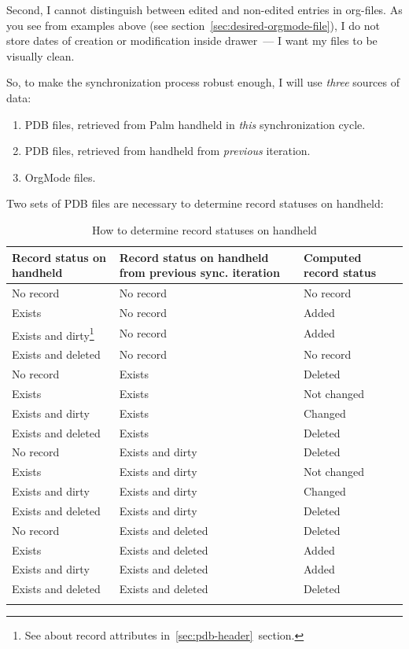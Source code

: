 \documentclass[a4paper,12pt,oneside]{scrartcl}
\begin{document}
Second, I cannot distinguish between edited and non-edited entries in
org-files. As you see from examples above (see
section~\ref{sec:desired-orgmode-file}), I do not store dates of creation or
modification inside drawer~--- I want my files to be visually clean.

So, to make the synchronization process robust enough, I will use \textit{three}
sources of data:
\begin{enumerate}
\item PDB files, retrieved from Palm handheld in \textit{this} synchronization
  cycle.
\item PDB files, retrieved from handheld from \textit{previous} iteration.
\item OrgMode files.
\end{enumerate}

Two sets of PDB files are necessary to determine record statuses on handheld:
\begin{longtable}[H]{|p{4cm}|p{4cm}|p{6cm}|}
  \hline
  \textbf{Record status on handheld}
  & \textbf{Record status on handheld from previous sync. iteration}
  & \textbf{Computed record status} \\
  \hline
  \hline
  No record & No record & No record \\
  \hline
  Exists & No record & Added \\
  \hline
  Exists and dirty\footnote{See about record attributes
  in~\ref{sec:pdb-header}~section.} & No record & Added \\
  \hline
  Exists and deleted & No record & No record \\
  \hline
  \hline
  No record & Exists & Deleted \\
  \hline
  Exists & Exists & Not changed \\
  \hline
  Exists and dirty & Exists & Changed \\
  \hline
  Exists and deleted & Exists & Deleted \\
  \hline
  \hline
  No record & Exists and dirty & Deleted \\
  \hline
  Exists & Exists and dirty & Not changed \\
  \hline
  Exists and dirty & Exists and dirty & Changed \\
  \hline
  Exists and deleted & Exists and dirty & Deleted \\
  \hline
  \hline
  No record & Exists and deleted & Deleted \\
  \hline
  Exists & Exists and deleted & Added \\
  \hline
  Exists and dirty & Exists and deleted & Added \\
  \hline
  Exists and deleted & Exists and deleted & Deleted \\
  \hline
  \caption{How to determine record statuses on
  handheld\label{tab:handheld-record-status}}
\end{longtable}
\end{document}
